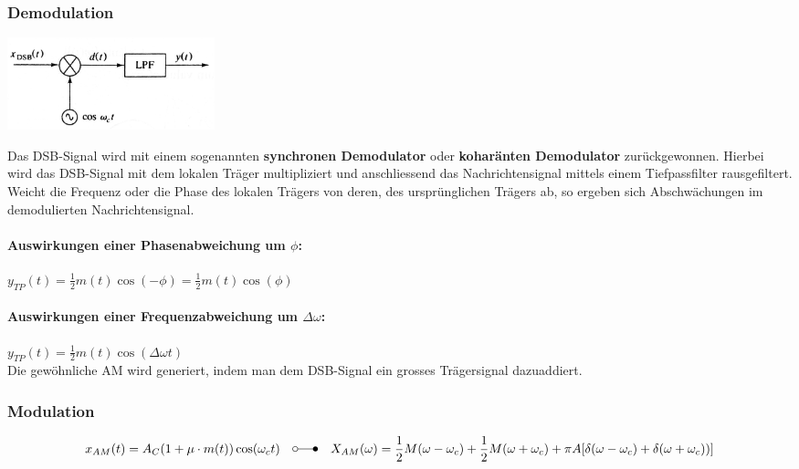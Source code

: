 \subsubsection{Demodulation} 
\label{am_dsb_modulation}
\begin{minipage}[t][2.3cm][c]{6.5cm}
    \includegraphics[width=6cm]{bilder/am_dsb_demodulation.png}
\end{minipage}
\begin{minipage}[t][2.3cm][c]{11.5cm}
	Das DSB-Signal wird mit einem sogenannten \textbf{synchronen Demodulator} oder \textbf{koharänten
	Demodulator} zurückgewonnen. Hierbei wird das DSB-Signal mit dem lokalen Träger
	multipliziert und anschliessend das Nachrichtensignal mittels einem Tiefpassfilter rausgefiltert.
	\\ Weicht die Frequenz oder die Phase des lokalen Trägers von deren, des ursprünglichen Trägers ab, 
	so ergeben sich Abschwächungen im demodulierten Nachrichtensignal.
\end{minipage}

\paragraph{Auswirkungen einer Phasenabweichung um $\phi$:} $y_{TP}(t) = \frac{1}{2}
m(t) \cos(-\phi)= \frac{1}{2} m(t) \cos(\phi) $
\paragraph{Auswirkungen einer Frequenzabweichung um $\Delta \omega$:} $y_{TP}(t) =
\frac{1}{2} m(t) \cos(\Delta \omega t)$\\



Die gewöhnliche AM wird generiert, indem man dem DSB-Signal ein grosses Trägersignal dazuaddiert.

\subsubsection{Modulation}

$$x_{AM}(t) = A_C (1 + \mu \cdot m(t)) \cos(\omega_c t)
	\quad \laplace \quad X_{AM}(\omega) = \frac{1}{2}M(\omega - \omega_c) + \frac{1}{2}M(\omega + \omega_c)
	+ \pi A [\delta (\omega - \omega_c) + \delta (\omega + \omega_c))]$$

